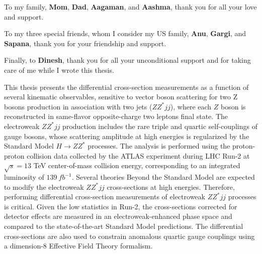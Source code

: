 \documentclass[red]{brandeis-dissertation}
\numberwithin{equation}{section}
\begin{document}
To my family, \textbf{Mom}, \textbf{Dad}, \textbf{Aagaman}, and \textbf{Aashma}, thank you for all your love and support. 

To my three special friends, whom I consider my US family, \textbf{Anu}, \textbf{Gargi}, and \textbf{Sapana}, thank you for your friendship and support. 

Finally, to \textbf{Dinesh}, thank you for all your unconditional support and for taking care of me while I wrote this thesis.
\clearpage

\begin{dissertation-abstract}

This thesis presents the differential cross-section measurements as a function of several kinematic observables, sensitive to vector boson scattering for two Z bosons production in association with two jets ($ZZ^*jj$), where each $Z$ boson is reconstructed in same-flavor opposite-charge two leptons final state. The electroweak $ZZ^*jj$ production includes the rare triple and quartic self-couplings of gauge bosons, whose scattering amplitude at high energies is regularized by the Standard Model $H\rightarrow ZZ^{*}$ processes. The analysis is performed using the proton-proton collision data collected by the ATLAS experiment during LHC Run-2 at $\sqrt{s}=13$ TeV center-of-mass collision energy, corresponding to an integrated luminosity of $139~fb^{-1}$. Several theories Beyond the Standard Model are expected to modify the electroweak $ZZ^*jj$ cross-sections at high energies. Therefore, performing differential cross-section measurements of electroweak $ZZ^*jj$ processes is critical. Given the low statistics in Run-2, the cross-sections corrected for detector effects are measured in an electroweak-enhanced phase space and compared to the state-of-the-art Standard Model predictions. The differential cross-sections are also used to constrain anomalous quartic gauge couplings using a dimension-8 Effective Field Theory formalism. 

\end{dissertation-abstract}
\clearpage

\doublespacing

\tableofcontents
\clearpage
{}
{}
\listoftables
\clearpage
{}
{}
\listoffigures
\clearpage


\clearpage
\end{document}
